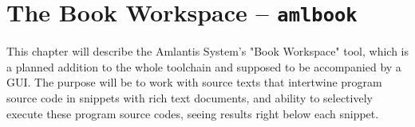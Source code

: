 
\chapter[The Book Workspace -- amlbook]{The Book Workspace -- \lstinline!amlbook!}
\label{ch:tools-amlbook}

This chapter will describe the Amlantis System's "Book Workspace" tool, which is a planned addition to the whole toolchain and supposed to be accompanied by a GUI. The purpose will be to work with source texts that intertwine program source code in snippets with rich text documents, and ability to selectively execute these program source codes, seeing results right below each snippet.






